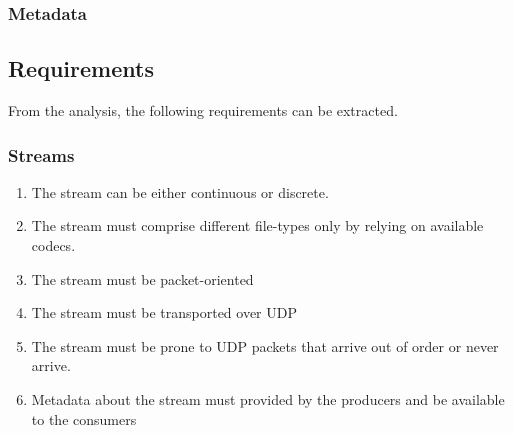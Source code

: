 \subsubsection{Metadata}


\subsection{Requirements}
From the analysis, the following requirements can be extracted.
\subsubsection{Streams}
\begin{enumerate}
	\item The stream can be either continuous or discrete.
	\item The stream must comprise different file-types only by relying on available codecs.
	\item The stream must be packet-oriented
	\item The stream must be transported over UDP
	\item The stream must be prone to UDP packets that arrive out of order or never arrive.
	\item Metadata about the stream must provided by the producers and be available to the consumers
\end{enumerate}

